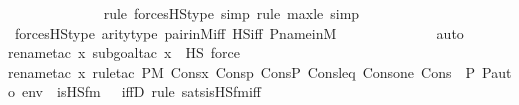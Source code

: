 \begin{isabellebody}
\ \ \ \ \ \ \ \ \ \ \ \ \ \isamarkupfalse%
{\isacharparenleft}{\kern0pt}rule\ forcesHS{\isacharprime}{\kern0pt}{\isacharunderscore}{\kern0pt}type{\isacharcomma}{\kern0pt}\ simp{\isacharcomma}{\kern0pt}\ rule\ max{\isacharunderscore}{\kern0pt}le{}{\isacharcomma}{\kern0pt}\ simp{\isacharparenright}{\kern0pt}\isanewline
\ \ \isamarkupfalse%
\ forcesHS{\isacharprime}{\kern0pt}{\isacharunderscore}{\kern0pt}type\ arity{\isacharunderscore}{\kern0pt}type\ pair{\isacharunderscore}{\kern0pt}in{\isacharunderscore}{\kern0pt}M{\isacharunderscore}{\kern0pt}iff\ HS{\isacharunderscore}{\kern0pt}iff\ P{\isacharunderscore}{\kern0pt}name{\isacharunderscore}{\kern0pt}in{\isacharunderscore}{\kern0pt}M\isanewline
\ \ \ \ \ \ \ \ \ \ \ \ \isamarkupfalse%
\ auto{\isacharbrackleft}{\kern0pt}{}{\isacharbrackright}{\kern0pt}\isanewline
\ \ \ \isamarkupfalse%
{\isacharparenleft}{\kern0pt}rename{\isacharunderscore}{\kern0pt}tac\ x{\isacharcomma}{\kern0pt}\ subgoal{\isacharunderscore}{\kern0pt}tac\ {\isachardoublequoteopen}x\ {\isasymin}\ HS{\isachardoublequoteclose}{\isacharcomma}{\kern0pt}\ force{\isacharparenright}{\kern0pt}\isanewline
\ \ \ \isamarkupfalse%
{\isacharparenleft}{\kern0pt}rename{\isacharunderscore}{\kern0pt}tac\ x{\isacharcomma}{\kern0pt}\ rule{\isacharunderscore}{\kern0pt}tac\ P{\isacharequal}{\kern0pt}{\isachardoublequoteopen}M{\isacharcomma}{\kern0pt}\ Cons{\isacharparenleft}{\kern0pt}x{\isacharcomma}{\kern0pt}\ Cons{\isacharparenleft}{\kern0pt}p{\isacharcomma}{\kern0pt}\ Cons{\isacharparenleft}{\kern0pt}P{\isacharcomma}{\kern0pt}\ Cons{\isacharparenleft}{\kern0pt}leq{\isacharcomma}{\kern0pt}\ Cons{\isacharparenleft}{\kern0pt}one{\isacharcomma}{\kern0pt}\ Cons{\isacharparenleft}{\kern0pt}{\isasymlangle}{\isasymF}{\isacharcomma}{\kern0pt}\ {\isasymG}{\isacharcomma}{\kern0pt}\ P{\isacharcomma}{\kern0pt}\ P{\isacharunderscore}{\kern0pt}auto{\isasymrangle}{\isacharcomma}{\kern0pt}\ env{\isacharparenright}{\kern0pt}{\isacharparenright}{\kern0pt}{\isacharparenright}{\kern0pt}{\isacharparenright}{\kern0pt}{\isacharparenright}{\kern0pt}{\isacharparenright}{\kern0pt}\ {\isasymTurnstile}\ is{\isacharunderscore}{\kern0pt}HS{\isacharunderscore}{\kern0pt}fm{\isacharparenleft}{\kern0pt}{}{\isacharcomma}{\kern0pt}\ {}{\isacharparenright}{\kern0pt}{\isachardoublequoteclose}\ \ iffD{}{\isacharcomma}{\kern0pt}\ rule\ sats{\isacharunderscore}{\kern0pt}is{\isacharunderscore}{\kern0pt}HS{\isacharunderscore}{\kern0pt}fm{\isacharunderscore}{\kern0pt}iff{\isacharparenright}{\kern0pt}\isanewline

\end{isabellebody}
